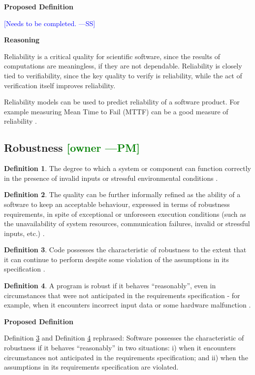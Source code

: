 \documentclass[letterpaper,cleveref]{lipics-v2019}
\newcommand{\authornote}[3]{\textcolor{#1}{[#3 ---#2]}}
\newcommand{\authornote}[3]{}
\newcommand{\wss}[1]{\authornote{blue}{SS}{#1}} %
\newcommand{\pmi}[1]{\authornote{green}{PM}{#1}} %
\theoremstyle{definition}
\newtheorem{defn}{Definition}
\begin{document}
\noindent \textbf{Proposed Definition}

\wss{Needs to be completed.}

\noindent \textbf{Reasoning}

Reliability is a critical quality for scientific software, since the results of
computations are meaningless, if they are not dependable.  Reliability is
closely tied to verifiability, since the key quality to verify is reliability,
while the act of verification itself improves reliability.

Reliability models can be used to predict reliability of a software product. For
example measuring Mean Time to Fail (MTTF) can be a good measure of reliability
\citep{berander2005software}.

\subsection{{Robustness} \pmi{owner}}
\begin{defn}
  The degree to which a system or component can function correctly in the
  presence of invalid inputs or stressful environmental conditions
  \citep{IEEEStdGlossarySET1990}.
\end{defn}
\begin{defn}
  The quality can be further informally refined as the ability of a software to
  keep an acceptable behaviour, expressed in terms of robustness requirements, in
  spite of exceptional or unforeseen execution conditions (such as the
  unavailability of system resources, communication failures, invalid or
  stressful inputs, etc.) \citep{fernandez2005model}.
\end{defn}
\begin{defn} \label{RobustnessPartialDefn}
  Code possesses the characteristic of robustness to the extent that it can
  continue to perform despite some violation of the assumptions in its
  specification \citep{boehm2007software}.
\end{defn}
\begin{defn} \label{RobustnessDefnSelected}
  A program is robust if it behaves ``reasonably'', even in circumstances that
  were not anticipated in the requirements specification - for example, when it
  encounters incorrect input data or some hardware malfunction
  \citep{ghezzi1991fundamentals}.
\end{defn}

\noindent \textbf{Proposed Definition}

Definition \ref{RobustnessPartialDefn} and Definition \ref{RobustnessDefnSelected} rephrased: Software possesses the
characteristic of robustness if it behaves ``reasonably'' in two situations: i)
when it encounters circumstances not anticipated in the requirements
specification; and ii) when the assumptions in its requirements specification
are violated.
\end{document}
